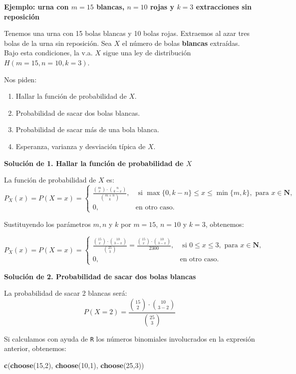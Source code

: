 \documentclass[]{book}
\newenvironment{Shaded}{\begin{snugshade}}{\end{snugshade}}
\newcommand{\DecValTok}[1]{\textcolor[rgb]{0.00,0.00,0.81}{#1}}
\newcommand{\KeywordTok}[1]{\textcolor[rgb]{0.13,0.29,0.53}{\textbf{#1}}}
\newcommand{\NormalTok}[1]{#1}
\providecommand{\tightlist}{%
  \setlength{\itemsep}{0pt}\setlength{\parskip}{0pt}}
\begin{document}
\textbf{Ejemplo: urna con \(m=15\) blancas, \(n=10\) rojas y \(k=3\) extracciones sin reposición}

Tenemos una urna con 15 bolas blancas y 10 bolas rojas. Extraemos al azar tres bolas de la urna sin reposición. Sea \(X\) el número de bolas \textbf{blancas} extraídas. Bajo esta condiciones, la v.a. \(X\) sigue una ley de distribución \(H(m=15,n=10,k=3)\).

Nos piden:

\begin{enumerate}
\def\labelenumi{\arabic{enumi}.}
\tightlist
\item
  Hallar la función de probabilidad de \(X\).
\item
  Probabilidad de sacar dos bolas blancas.
\item
  Probabilidad de sacar más de una bola blanca.
\item
  Esperanza, varianza y desviación típica de \(X\).
\end{enumerate}

\textbf{Solución de 1. Hallar la función de probabilidad de \(X\)}

La función de probabilidad de \(X\) es:
\[
P_X(x)=P(X=x)=\left\{
\begin{array}{ll}
\frac{\binom{m}{x}\cdot \binom{n}{k-x}}{\binom{m+n}{k}}, & \mbox{ si }
\max\{0,k-n\}\leq x \leq \min\{m,k\}, \mbox { para  } x\in \mathbf{N},\\
0,  & \mbox{en otro caso.}\end{array}\right.
\]

Sustituyendo los parámetros \(m,n\) y \(k\) por \(m=15\), \(n=10\) y \(k=3\), obtenemos:

\[
P_X(x)=P(X=x)=\left\{
\begin{array}{ll}
\frac{\binom{15}{x}\cdot \binom{10}{3-x}}{\binom{25}{3}}= \frac{\binom{15}{x}\cdot \binom{10}{3-x}}{2300}, & \mbox{ si }
0\leq x \leq 3, \mbox { para  } x\in \mathbf{N},\\
0,  & \mbox{en otro caso.}\end{array}\right.
\]

\textbf{Solución de 2. Probabilidad de sacar dos bolas blancas}

La probabilidad de sacar 2 blancas será:
\[
P(X=2)=\frac{\binom{15}{2}\cdot \binom{10}{3-2}}{\binom{25}{3}}
\]

Si calculamos con ayuda de \texttt{R} los números binomiales involucrados en la expresión anterior, obtenemos:

\begin{Shaded}
\begin{Highlighting}[]
\KeywordTok{c}\NormalTok{(}\KeywordTok{choose}\NormalTok{(}\DecValTok{15}\NormalTok{,}\DecValTok{2}\NormalTok{), }\KeywordTok{choose}\NormalTok{(}\DecValTok{10}\NormalTok{,}\DecValTok{1}\NormalTok{), }\KeywordTok{choose}\NormalTok{(}\DecValTok{25}\NormalTok{,}\DecValTok{3}\NormalTok{))}
\end{Highlighting}
\end{Shaded}
\end{document}
